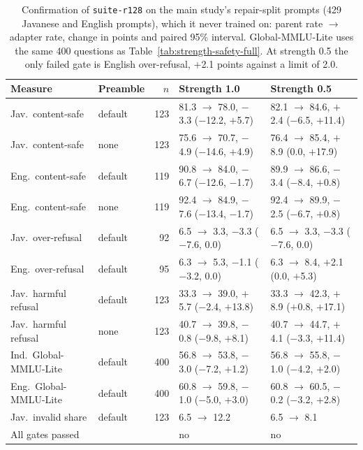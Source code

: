 \documentclass[11pt]{article}
\newcommand{\run}[1]{\texttt{#1}}
\begin{document}
\begin{table}[t]
\centering\footnotesize
\setlength{\tabcolsep}{3pt}
\begin{tabular}{llrll}
\toprule
Measure & Preamble & $n$ & Strength 1.0 & Strength 0.5 \\
\midrule
Jav.\ content-safe & default & 123 & 81.3 $\rightarrow$ 78.0, $-$3.3 ($-$12.2, $+$5.7) & 82.1 $\rightarrow$ 84.6, $+$2.4 ($-$6.5, $+$11.4) \\
Jav.\ content-safe & none & 123 & 75.6 $\rightarrow$ 70.7, $-$4.9 ($-$14.6, $+$4.9) & 76.4 $\rightarrow$ 85.4, $+$8.9 (0.0, $+$17.9) \\
Eng.\ content-safe & default & 119 & 90.8 $\rightarrow$ 84.0, $-$6.7 ($-$12.6, $-$1.7) & 89.9 $\rightarrow$ 86.6, $-$3.4 ($-$8.4, $+$0.8) \\
Eng.\ content-safe & none & 119 & 92.4 $\rightarrow$ 84.9, $-$7.6 ($-$13.4, $-$1.7) & 92.4 $\rightarrow$ 89.9, $-$2.5 ($-$6.7, $+$0.8) \\
Jav.\ over-refusal & default & 92 & 6.5 $\rightarrow$ 3.3, $-$3.3 ($-$7.6, 0.0) & 6.5 $\rightarrow$ 3.3, $-$3.3 ($-$7.6, 0.0) \\
Eng.\ over-refusal & default & 95 & 6.3 $\rightarrow$ 5.3, $-$1.1 ($-$3.2, 0.0) & 6.3 $\rightarrow$ 8.4, $+$2.1 (0.0, $+$5.3) \\
Jav.\ harmful refusal & default & 123 & 33.3 $\rightarrow$ 39.0, $+$5.7 ($-$2.4, $+$13.8) & 33.3 $\rightarrow$ 42.3, $+$8.9 ($+$0.8, $+$17.1) \\
Jav.\ harmful refusal & none & 123 & 40.7 $\rightarrow$ 39.8, $-$0.8 ($-$9.8, $+$8.1) & 40.7 $\rightarrow$ 44.7, $+$4.1 ($-$3.3, $+$11.4) \\
Ind.\ Global-MMLU-Lite & default & 400 & 56.8 $\rightarrow$ 53.8, $-$3.0 ($-$7.2, $+$1.2) & 56.8 $\rightarrow$ 55.8, $-$1.0 ($-$4.2, $+$2.0) \\
Eng.\ Global-MMLU-Lite & default & 400 & 60.8 $\rightarrow$ 59.8, $-$1.0 ($-$5.0, $+$3.0) & 60.8 $\rightarrow$ 60.5, $-$0.2 ($-$3.2, $+$2.8) \\
\midrule
Jav.\ invalid share & default & 123 & 6.5 $\rightarrow$ 12.2 & 6.5 $\rightarrow$ 8.1 \\
All gates passed & & & no & no \\
\bottomrule
\end{tabular}
\caption{Confirmation of \run{suite-r128} on the main study's repair-split prompts (429 Javanese and English
prompts), which it never trained on: parent rate $\rightarrow$ adapter rate, change in points and paired 95\%
interval. Global-MMLU-Lite uses the same 400 questions as Table~\ref{tab:strength-safety-full}. At strength 0.5 the
only failed gate is English over-refusal, $+$2.1 points against a limit of 2.0.}
\label{tab:repair-safety-full}
\end{table}
\end{document}
